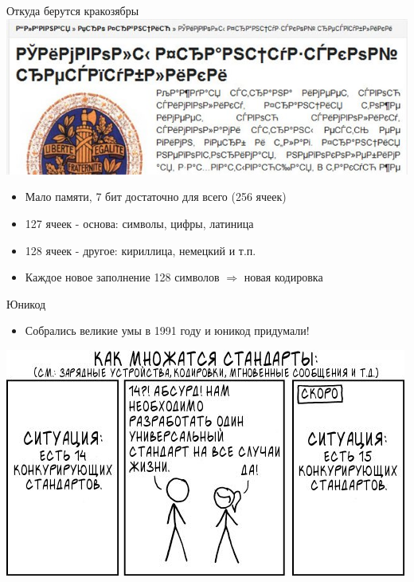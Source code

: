\documentclass[aspectratio=169]{beamer} %
\begin{document}
\begin{frame}{Откуда берутся кракозябры} 
\centering \includegraphics[width=0.7\linewidth]{krakozabr.jpg}	
\vspace{0.3cm}

\begin{itemize}
\item Мало памяти, 7 бит достаточно для всего (256 ячеек)
\item 127 ячеек - основа: символы, цифры, латиница
\item 128 ячеек - другое: кириллица, немецкий и т.п.
\item Каждое новое заполнение 128 символов $\Rightarrow$ новая кодировка
\end{itemize}
\end{frame}


\begin{frame}{Юникод} 
\begin{itemize}
\item Собрались великие умы в 1991 году и юникод придумали!
\end{itemize}

\centering  \includegraphics[width=0.7\linewidth]{stdcom.jpg}	
\end{frame}
\end{document}
